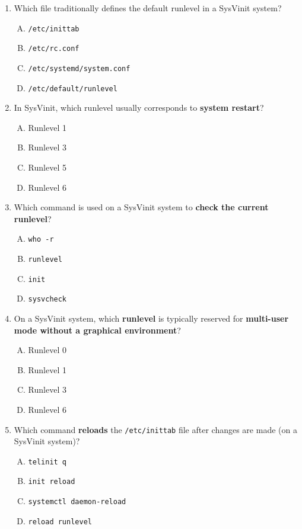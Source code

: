 \documentclass[a4paper]{report}
\begin{document}
\begin{enumerate}[1.]

    \item Which file traditionally defines the default runlevel in a SysVinit system?
    \begin{enumerate}[A)]
        \item \texttt{/etc/inittab}
        \item \texttt{/etc/rc.conf}
        \item \texttt{/etc/systemd/system.conf}
        \item \texttt{/etc/default/runlevel}
    \end{enumerate}
    
    \item In SysVinit, which runlevel usually corresponds to \textbf{system restart}?
    \begin{enumerate}[A)]
        \item Runlevel 1
        \item Runlevel 3
        \item Runlevel 5
        \item Runlevel 6
    \end{enumerate}
    
    \item Which command is used on a SysVinit system to \textbf{check the current runlevel}?
    \begin{enumerate}[A)]
        \item \texttt{who -r}
        \item \texttt{runlevel}
        \item \texttt{init}
        \item \texttt{sysvcheck}
    \end{enumerate}
    
    \item On a SysVinit system, which \textbf{runlevel} is typically reserved for \textbf{multi-user mode without a graphical environment}?
    \begin{enumerate}[A)]
        \item Runlevel 0
        \item Runlevel 1
        \item Runlevel 3
        \item Runlevel 6
    \end{enumerate}
    
    \item Which command \textbf{reloads} the \texttt{/etc/inittab} file after changes are made (on a SysVinit system)?
    \begin{enumerate}[A)]
        \item \texttt{telinit q}
        \item \texttt{init reload}
        \item \texttt{systemctl daemon-reload}
        \item \texttt{reload runlevel}
    \end{enumerate}
    

\end{enumerate}
\end{document}

